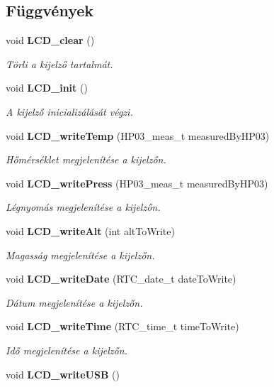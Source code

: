 \subsection*{Függvények}
\begin{DoxyCompactItemize}
\item 
void {\bf L\-C\-D\-\_\-clear} ()
\begin{DoxyCompactList}\small\item\em Törli a kijelző tartalmát. \end{DoxyCompactList}\item 
void {\bf L\-C\-D\-\_\-init} ()
\begin{DoxyCompactList}\small\item\em A kijelző inicializálását végzi. \end{DoxyCompactList}\item 
void {\bf L\-C\-D\-\_\-write\-Temp} (H\-P03\-\_\-meas\-\_\-t measured\-By\-H\-P03)
\begin{DoxyCompactList}\small\item\em Hőmérséklet megjelenítése a kijelzőn. \end{DoxyCompactList}\item 
void {\bf L\-C\-D\-\_\-write\-Press} (H\-P03\-\_\-meas\-\_\-t measured\-By\-H\-P03)
\begin{DoxyCompactList}\small\item\em Légnyomás megjelenítése a kijelzőn. \end{DoxyCompactList}\item 
void {\bf L\-C\-D\-\_\-write\-Alt} (int alt\-To\-Write)
\begin{DoxyCompactList}\small\item\em Magasság megjelenítése a kijelzőn. \end{DoxyCompactList}\item 
void {\bf L\-C\-D\-\_\-write\-Date} (R\-T\-C\-\_\-date\-\_\-t date\-To\-Write)
\begin{DoxyCompactList}\small\item\em Dátum megjelenítése a kijelzőn. \end{DoxyCompactList}\item 
void {\bf L\-C\-D\-\_\-write\-Time} (R\-T\-C\-\_\-time\-\_\-t time\-To\-Write)
\begin{DoxyCompactList}\small\item\em Idő megjelenítése a kijelzőn. \end{DoxyCompactList}\item 
void {\bf L\-C\-D\-\_\-write\-U\-S\-B} ()

\end{DoxyCompactItemize}
